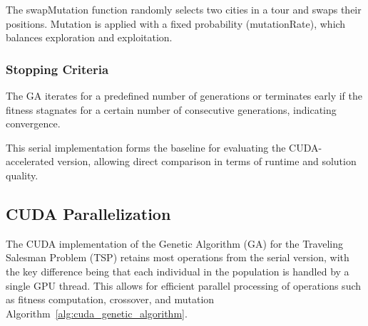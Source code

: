 \documentclass[conference]{IEEEtran}
\begin{document}
The swapMutation function randomly selects two cities in a tour and swaps their positions. Mutation is applied with a fixed probability (mutationRate), which balances exploration and exploitation.\\

\subsubsection{Stopping Criteria}

The GA iterates for a predefined number of generations or terminates early if the fitness stagnates for a certain number of consecutive generations, indicating convergence.



This serial implementation forms the baseline for evaluating the CUDA-accelerated version, allowing direct comparison in terms of runtime and solution quality.\\


\subsection{CUDA Parallelization}


The CUDA implementation of the Genetic Algorithm (GA) for the Traveling Salesman Problem (TSP) retains most operations from the serial version, with the key difference being that each individual in the population is handled by a single GPU thread. This allows for efficient parallel processing of operations such as fitness computation, crossover, and mutation Algorithm~\ref{alg:cuda_genetic_algorithm}.
\end{document}
